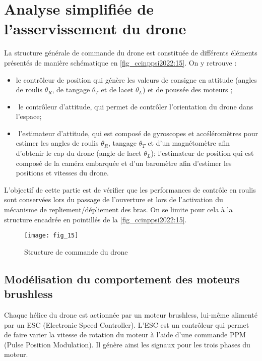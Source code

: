 
\section{\label{sec:03} Analyse simplifiée de l’asservissement du drone}

La structure générale de commande du drone est constituée de différents éléments présentés de manière schématique en \autoref{fig_ccinppsi2022:15}. On y retrouve :
\begin{itemize}
\item le contrôleur de position qui génère les valeurs de consigne en attitude 
(angles de roulis $\theta_R$, 
de tangage $\theta_T$ 
et de lacet $\theta_L$)
et de poussée des moteurs ;
\item­ le contrôleur d’attitude, qui permet de contrôler l’orientation du drone dans l’espace;
\item­ l’estimateur d’attitude, qui est composé de gyroscopes et accéléromètres pour estimer
les angles de roulis $\theta_R$, tangage $\theta_T$ et d’un magnétomètre afin d’obtenir le cap du drone
(angle de lacet $\theta_L$);
­ l’estimateur de position qui est composé de la caméra embarquée et d’un baromètre
afin d’estimer les positions et vitesses du drone.
\end{itemize}

\begin{obj}
L’objectif de cette partie est de vérifier que les performances de contrôle en roulis sont
conservées lors du passage de l’ouverture et lors de l’activation du mécanisme de repliement/dépliement des bras. On se limite pour cela à la structure encadrée en pointillés de la
\autoref{fig_ccinppsi2022:15}.
\end{obj}


\begin{figure}[H]
\centering
\texttt{[image: fig\_15]}
\caption{\label{fig_ccinppsi2022:15} Structure de commande du drone}
\end{figure}

\subsection{­Modélisation du comportement des moteurs brushless}

Chaque hélice du drone est actionnée par un moteur brushless, lui-même alimenté par un
ESC (Electronic Speed Controller). L’ESC est un contrôleur qui permet de faire varier la
vitesse de rotation du moteur à l’aide d’une commande PPM (Pulse Position Modulation). Il
génère ainsi les signaux pour les trois phases du moteur.

